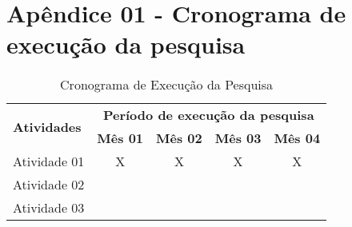 \section{Apêndice 01 - Cronograma de execução da pesquisa}


\begin{table}[H]
    \centering
    \begin{tabular}{|l|c|c|c|c|}
        \hline
        \multirow{2}{7.5cm}{\textbf{Atividades}} & \multicolumn{4}{c|}{\textbf{Período de execução da pesquisa}} \\ \cline{2-5}
        & \textbf{Mês 01} & \textbf{Mês 02} & \textbf{Mês 03} & \textbf{Mês 04} \\ \hline
        Atividade 01 & X & X & X & X \\ \hline
        Atividade 02 &   &   &   &   \\ \hline
        Atividade 03 &   &   &   &   \\ \hline
    \end{tabular}
\caption{Cronograma de Execução da Pesquisa}
\end{table}
    